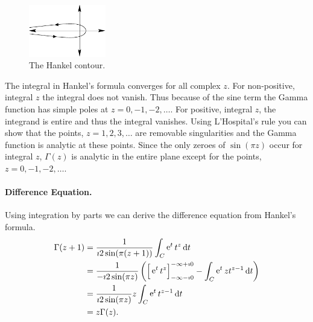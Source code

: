 \begin{figure}[h!]
  \begin{center}




    \includegraphics[width=0.3\textwidth]{ode/gamma/fig_hank_cont}
  \end{center}

  \caption{The Hankel contour.}
  \label{fig_hank_cont}
\end{figure}

The integral in Hankel's formula converges for all complex $z$.  For 
non-positive, integral $z$ the integral does not vanish.  Thus because of 
the sine term the Gamma function has simple poles at $z = 0, -1, -2, \ldots$.
For positive, integral $z$, the integrand is entire and thus the integral 
vanishes.  Using L'Hospital's rule you can show that the points, $z = 
1, 2, 3, \ldots$ are removable singularities and the Gamma function is
analytic at these points.  Since the only zeroes of $\sin(\pi z)$ occur for
integral $z$, $\Gamma(z)$ is analytic in the entire plane except for the
points, $z = 0, -1, -2, \ldots$.






\paragraph{Difference Equation.}
Using integration by parts we can derive the difference equation from
Hankel's formula.
\begin{align*}
  \Gamma(z+1)
  &= \frac{1}{\imath 2 \sin(\pi (z+1))} \int_C \mathop{\mathrm{e}}\nolimits^t t^z \,\mathrm{d} t \\
  &= \frac{1}{- \imath 2 \sin(\pi z)} \left( \Big[\mathop{\mathrm{e}}\nolimits^t t^z\Big]_{-\infty - \imath 0}
    ^{-\infty + \imath 0} - \int_C \mathop{\mathrm{e}}\nolimits^t z t^{z-1} \,\mathrm{d} t \right) \\
  &= \frac{1}{\imath 2 \sin(\pi z)} z \int_C \mathop{\mathrm{e}}\nolimits^t t^{z-1} \,\mathrm{d} t \\
  &= z \Gamma(z).
\end{align*}

